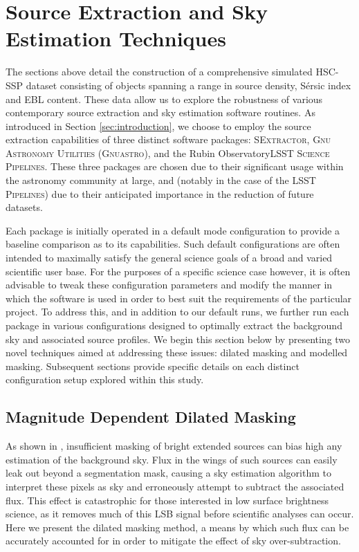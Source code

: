 \documentclass[fleqn,usenatbib,useAMS]{mnras}
\newcommand*{\Sersic}{S\'{e}rsic\xspace}
\newcommand*{\SExtractor}{\textsc{SExtractor}\xspace}
\newcommand*{\Gnuastro}{\textsc{Gnuastro}\xspace}
\newcommand*{\LSSTSPs}{\textsc{LSST Science Pipelines}\xspace}
\newcommand*{\LSSTPs}{\textsc{LSST Pipelines}\xspace}
\newcommand*{\RO}{Rubin Observatory\xspace}
\begin{document}
\section{Source Extraction and Sky Estimation Techniques}
\label{sec:sextraction}

The sections above detail the construction of a comprehensive simulated HSC-SSP dataset consisting of objects spanning a range in source density, \Sersic index and EBL content. These data allow us to explore the robustness of various contemporary source extraction and sky estimation software routines. As introduced in Section \ref{sec:introduction}, we choose to employ the source extraction capabilities of three distinct software packages: \SExtractor, \textsc{Gnu Astronomy Utilities} (\Gnuastro), and the \RO \LSSTSPs \citep[hereafter, \LSSTPs]{Bosch2018,Bosch2019}. These three packages are chosen due to their significant usage within the astronomy community at large, and (notably in the case of the \LSSTPs) due to their anticipated importance in the reduction of future datasets. 

Each package is initially operated in a default mode configuration to provide a baseline comparison as to its capabilities. Such default configurations are often intended to maximally satisfy the general science goals of a broad and varied scientific user base. For the purposes of a specific science case however, it is often advisable to tweak these configuration parameters and modify the manner in which the software is used in order to best suit the requirements of the particular project. To address this, and in addition to our default runs, we further run each package in various configurations designed to optimally extract the background sky and associated source profiles. We begin this section below by presenting two novel techniques aimed at addressing these issues: dilated masking and modelled masking. Subsequent sections provide specific details on each distinct configuration setup explored within this study. 

\subsection{Magnitude Dependent Dilated Masking}
\label{sec:dilatedmasking}

As shown in \citet{Ji2018}, insufficient masking of bright extended sources can bias high any estimation of the background sky. Flux in the wings of such sources can easily leak out beyond a segmentation mask, causing a sky estimation algorithm to interpret these pixels as sky and erroneously attempt to subtract the associated flux. This effect is catastrophic for those interested in low surface brightness science, as it removes much of this LSB signal before scientific analyses can occur. Here we present the dilated masking method, a means by which such flux can be accurately accounted for in order to mitigate the effect of sky over-subtraction. 
\end{document}
